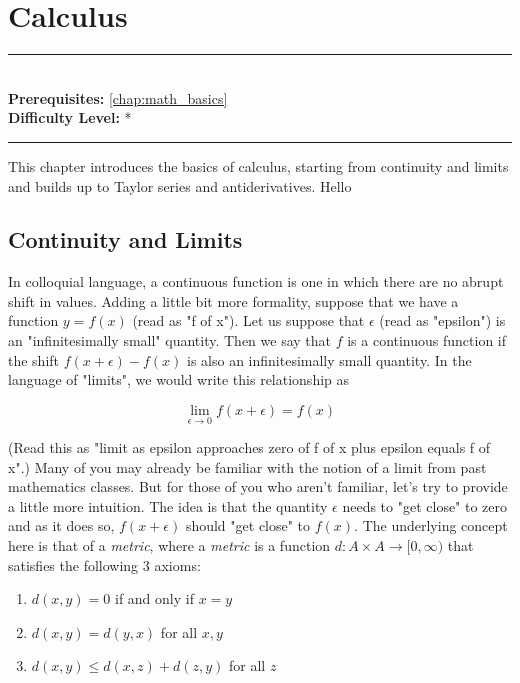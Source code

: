 \documentclass[book.tex]{subfiles}
\begin{document}
\chapter{Calculus}
\label{chap:calculus}
\noindent\rule{11cm}{0.4pt} \\
\textbf{Prerequisites:} \autoref{chap:math_basics} \\
\textbf{Difficulty Level:} * \\
\noindent\rule{11cm}{0.4pt}
\vspace{5mm}

This chapter introduces the basics of calculus, starting from continuity and limits and builds up to Taylor series and antiderivatives. Hello

\section{Continuity and Limits}

In colloquial language, a continuous function is one in which there are no abrupt shift in values. Adding a little bit more formality, suppose that we have a function $y = f(x)$ (read as "f of x"). Let us suppose that $\epsilon$ (read as "epsilon") is an "infinitesimally small" quantity. Then we say that $f$ is a continuous function if the shift $f(x + \epsilon) - f(x)$ is also an infinitesimally small quantity. In the language of "limits", we would write this relationship as 

\begin{equation*}
    \lim_{\epsilon \to 0} f(x + \epsilon) = f(x)
\end{equation*}

(Read this as "limit as epsilon approaches zero of f of x plus epsilon equals f of x".) Many of you may already be familiar with the notion of a limit from past mathematics classes. But for those of you who aren't familiar, let's try to provide a little more intuition. The idea is that the quantity $\epsilon$ needs to "get close" to zero and as it does so, $f(x + \epsilon)$ should "get close" to $f(x)$. The underlying concept here is that of a \textit{metric}, where a \textit{metric} is a function $d: A \times A \to [0, \infty)$ that satisfies the following 3 axioms:

\begin{enumerate}
    \item $d(x, y) = 0$ if and only if $x = y$
    \item $d(x, y) = d(y, x)$ for all $x, y$
    \item $d(x, y) \leq d(x, z) + d(z, y)$ for all $z$
\end{enumerate}
\end{document}

